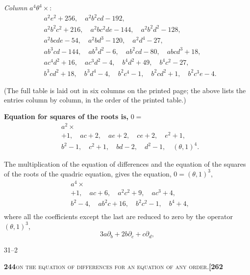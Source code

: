 \documentclass[11pt]{article}
\begin{document}
\noindent\textit{Column } $a^4 \theta^4 \times$:
\[
\begin{aligned}
  & a^2 e^2 + 256,\quad a^2 b^2 c d - 192,\\
  & a^2 b^2 c^2 + 216,\quad a^2 b c^2 d e - 144,\quad a^2 b^2 d^2 - 128,\\
  & a^2 b c d e - 54,\quad a^2 b d^3 - 120,\quad a^2 d^4 - 27,\\
  & a b^3 c d - 144,\quad a b^3 d^2 - 6,\quad a b^2 c d - 80,\quad a b c d^3 + 18,\\
  & a c^4 d^2 + 16,\quad a c^3 d^2 - 4,\quad b^4 d^2 + 49,\quad b^4 c^2 - 27,\\
  & b^3 c d^2 + 18,\quad b^3 d^4 - 4,\quad b^2 c^4 - 1,\quad b^2 c d^2 + 1,\quad b^2 c^3 e - 4.
\end{aligned}
\]

\noindent (The full table is laid out in six columns on the printed page; the above lists the entries column by column, in the order of the printed table.)

\medskip

\noindent\textbf{Equation for squares of the roots is, } $0 = $
\[
\begin{aligned}
  & a^2 \times\\
  & +1,\quad ac + 2,\quad ae + 2,\quad ce + 2,\quad e^2 + 1,\\
  & b^2 - 1,\quad c^2 + 1,\quad bd - 2,\quad d^2 - 1,\quad (\theta, 1)^4.
\end{aligned}
\]

\medskip

\noindent The multiplication of the equation of differences and the equation of the squares of the roots of the quadric equation, gives the equation, $0 = (\theta, 1)^3$,
\[
\begin{aligned}
  & a^4 \times\\
  & +1,\quad ac + 6,\quad a^2 c^2 + 9,\quad ac^3 + 4,\\
  & b^2 - 4,\quad ab^2 c + 16,\quad b^2 c^2 - 1,\quad b^4 + 4,\\
\end{aligned}
\]
where all the coefficients except the last are reduced to zero by the operator $(\theta, 1)^3$,
\[
  3a\partial_b + 2b\partial_c + c\partial_d,
\]

\medskip

\hfill {\footnotesize 31--2}

\newpage
\noindent\textbf{244}\hfill\textsc{on the equation of differences for an equation of any order.}\hfill\textbf{[262}
\end{document}
